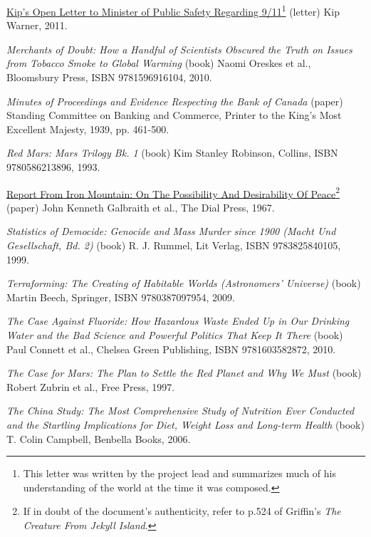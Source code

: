 \item
\href{http://www.thevertigo.com/html/9-11/}{Kip's Open Letter to Minister of Public Safety Regarding 9/11}\footnote{This letter was written by the project lead and summarizes much of his understanding of the world at the time it was composed.} (letter)\crlf
Kip Warner, 2011.

\item
{\it Merchants of Doubt: How a Handful of Scientists Obscured the Truth on Issues from Tobacco Smoke to Global Warming} (book)\crlf
Naomi Oreskes et al., Bloomsbury Press, ISBN 9781596916104, 2010.

\item
{\it Minutes of Proceedings and Evidence Respecting the Bank of Canada} (paper)\crlf
Standing Committee on Banking and Commerce, Printer to the King's Most Excellent Majesty, 1939, pp. 461-500.

\item
{\it Red Mars: Mars Trilogy Bk. 1} (book)\crlf
Kim Stanley Robinson, Collins, ISBN 9780586213896, 1993.

\item
\href{http://www.teachpeace.com/Report_from_Iron_Mountain.pdf}{Report From Iron Mountain: On The Possibility And Desirability Of Peace}\footnote{If in doubt of the document's authenticity, refer to p.524 of Griffin's {\it The Creature From Jekyll Island}.} (paper)\crlf
John Kenneth Galbraith et al., The Dial Press, 1967.

\item
{\it Statistics of Democide: Genocide and Mass Murder since 1900 (Macht Und Gesellschaft, Bd. 2)} (book)\crlf
R. J. Rummel, Lit Verlag, ISBN 9783825840105, 1999.

\item
{\it Terraforming: The Creating of Habitable Worlds (Astronomers' Universe)} (book)\crlf
Martin Beech, Springer, ISBN 9780387097954, 2009.

\item
{\it The Case Against Fluoride: How Hazardous Waste Ended Up in Our Drinking Water and the Bad Science and Powerful Politics That Keep It There} (book)\crlf
Paul Connett et al., Chelsea Green Publishing, ISBN 9781603582872, 2010.

\item
{\it The Case for Mars: The Plan to Settle the Red Planet and Why We Must} (book)\crlf
Robert Zubrin et al., Free Press, 1997.

\item
{\it The China Study: The Most Comprehensive Study of Nutrition Ever Conducted and the Startling Implications for Diet, Weight Loss and Long-term Health} (book)\crlf
T. Colin Campbell, Benbella Books, 2006.

